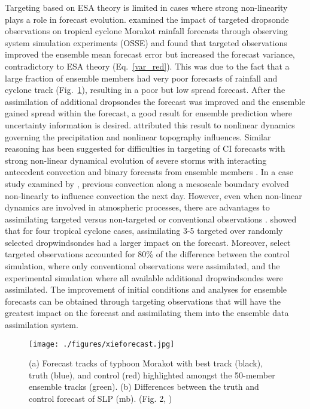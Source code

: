 \documentclass{ttuthes2007}
\newcommand{\tab}{\hspace*{2em}}  %
\begin{document}
\tab Targeting based on ESA theory is limited in cases where strong non-linearity plays a role in forecast evolution. \cite{Xieetal2013} examined the impact of targeted dropsonde observations on tropical cyclone Morakot rainfall forecasts through observing system simulation experiments (OSSE) and found that targeted observations improved the ensemble mean forecast error but increased the forecast variance, contradictory to ESA theory (Eq.~\ref{var_red}). This was due to the fact that a large fraction of ensemble members had very poor forecasts of rainfall and cyclone track (Fig.~\ref{xieforecast}), resulting in a poor but low spread forecast. After the assimilation of additional dropsondes the forecast was improved and the ensemble gained spread within the forecast, a good result for ensemble prediction where uncertainty information is desired. \cite{Xieetal2013} attributed this result to nonlinear dynamics governing the precipitation and nonlinear topography influences. Similar reasoning has been suggested for difficulties in targeting of CI forecasts with strong non-linear dynamical evolution of severe storms with interacting antecedent convection and binary forecasts from ensemble members \citep{Hilletal2013}. In a case study examined by \cite{Hilletal2013}, previous convection along a mesoscale boundary evolved non-linearly to influence convection the next day. However, even when non-linear dynamics are involved in atmospheric processes, there are advantages to assimilating targeted versus non-targeted or conventional observations \citep{Jungetal2012,KangandXu2012,KnopfmeierandStensrud2013,PoterjoyandZhang2014,Torn2014}. \cite{Torn2014} showed that for four tropical cyclone cases, assimilating 3-5 targeted over randomly selected dropwindsondes had a larger impact on the forecast. Moreover, select targeted observations accounted for 80\% of the difference between the control simulation, where only conventional observations were assimilated, and the experimental simulation where all available additional dropwindsondes were assimilated. The improvement of initial conditions and analyses for ensemble forecasts can be obtained through targeting observations that will have the greatest impact on the forecast and assimilating them into the ensemble data assimilation system.  

\begin{figure}[!tb]
  \centering
  \noindent\texttt{[image: ./figures/xieforecast.jpg]}\\
  \caption{(a) Forecast tracks of typhoon Morakot with best track (black), truth (blue), and control (red) highlighted amongst the 50-member ensemble tracks (green). (b) Differences between the truth and control forecast of SLP (mb). (Fig. 2, \citealt{Xieetal2013})}
\label{xieforecast}
\end{figure}
\end{document}
